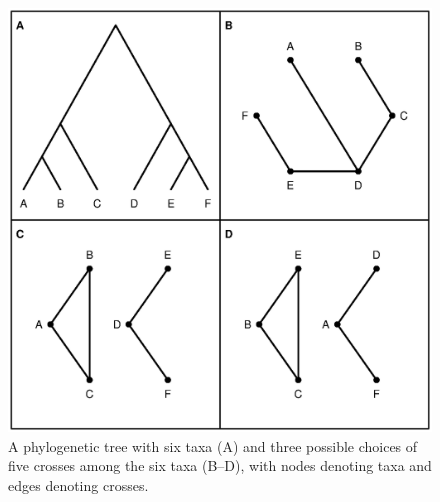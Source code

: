 \documentclass[12pt,letterpaper]{article}
\begin{document}
\newpage
\begin{figure}
\centering
\includegraphics[width=\textwidth]{Figs/fig2.eps}

\vspace{1cm}

\caption{A phylogenetic tree with six taxa (A) and three possible choices of
  five crosses among the six taxa (B--D), with nodes denoting taxa and edges
  denoting crosses.\label{fig:sixtaxa}}
\end{figure}
\end{document}

